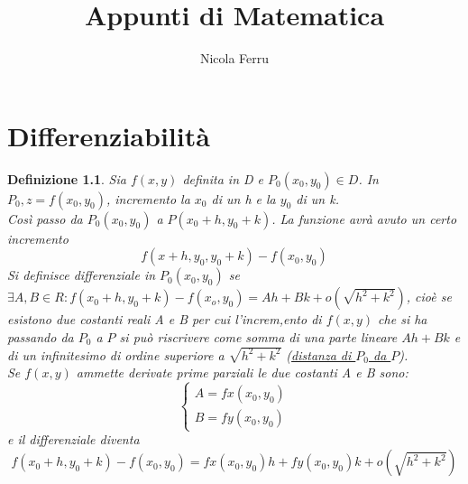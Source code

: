 \documentclass{book}
\title{Appunti di Matematica}
\author{Nicola Ferru}
\date{}
\newtheorem{defi}{Definizione}
\begin{document}


\tableofcontents
\listoftables
\listoffigures





\chapter{Differenziabilità}
\begin{defi}
  Sia $f(x,y)$ definita in D e $P_0(x_0,y_0)\in D$. In $P_0, z=f(x_0,y_0)$, incremento la $x_0$
  di un h e la $y_0$ di un k.\\
  Così passo da $P_0(x_0,y_0)$ a $P(x_0+h,y_0+k)$. La funzione avrà avuto un certo incremento
  \begin{equation*}
    f(x+h,y_0,y_0+k)-f(x_0,y_0)
  \end{equation*}
  Si definisce {\color{red}differenziale} in $P_0(x_0,y_0)$ se
  $\exists A,B \in R: f(x_0+h,y_0+k)-f(x_o,y_0)=Ah+Bk+o(\sqrt{h^2+k^2})$, cioè se esistono
  due costanti reali A e B per cui l'increm,ento di $f(x,y)$ che si ha passando da $P_0$ a $P$
  si può riscrivere come somma di una parte lineare $Ah+Bk$ e di un infinitesimo di ordine
  superiore a $\sqrt{h^2+k^2}$ (\underline{distanza di $P_0$ da $P$}).\\
  Se $f(x,y)$ ammette derivate prime parziali le due costanti A e B sono:
  \begin{equation*}
    \begin{cases}
      A=fx(x_0,y_0)\\
      B=fy(x_0,y_0)
    \end{cases}
  \end{equation*}
  e il differenziale diventa
  \begin{equation}
    f(x_0+h,y_0+k) - f(x_0,y_0)=fx(x_0,y_0)h+fy(x_0,y_0)k+o(\sqrt{h^2+k^2})
  \end{equation}
\end{defi}
\end{document}
